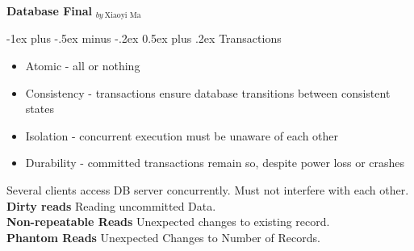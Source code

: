 \documentclass[10pt,landscape]{article}
\makeatletter
\renewcommand{\section}{\@startsection{section}{1}{0mm}%
                                {-1ex plus -.5ex minus -.2ex}%
                                {0.5ex plus .2ex}%
                                {\normalfont\large\bfseries}}
\makeatother
\begin{document}
\raggedright
\footnotesize
\begin{multicols}{3}


\setlength{\premulticols}{1pt}
\setlength{\postmulticols}{1pt}
\setlength{\multicolsep}{1pt}
\setlength{\columnsep}{2pt}

\begin{center}
     \Large{\textbf{Database Final} $_{by\ \text{Xiaoyi  Ma}}$} \\
\end{center}


\section{Transactions}
\begin{itemize}
    \item Atomic - all or nothing
    \item Consistency - transactions ensure database transitions between consistent states
    \item Isolation - concurrent execution must be unaware of each other
    \item Durability - committed transactions remain so, despite power loss or crashes
\end{itemize}



Several clients access DB server concurrently. Must not interfere with each other.\\
\textbf{Dirty reads} Reading uncommitted Data.\\
\textbf{Non-repeatable Reads }Unexpected changes to existing record.\\
\textbf{Phantom Reads} Unexpected Changes to Number of Records.\\





\end{multicols}
\end{document}
